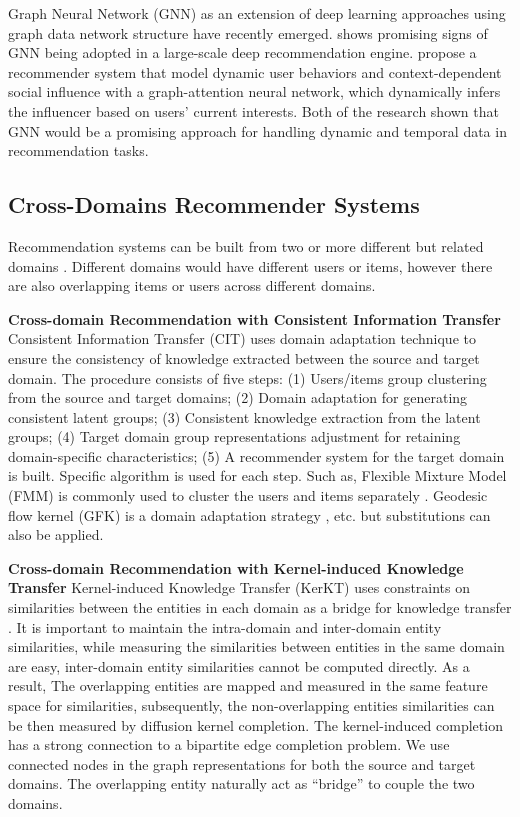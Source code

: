 Graph Neural Network (GNN) as an extension of deep learning approaches using graph data network structure have recently emerged. \citet{ying2018graph} shows promising signs of GNN being adopted in a large-scale deep recommendation engine. \citet{song2019session} propose a recommender system that model dynamic user behaviors and context-dependent social influence with a graph-attention neural network, which dynamically infers the influencer based on users’ current interests. Both of the research shown that GNN would be a promising approach for handling dynamic and temporal data in recommendation tasks.

\subsection{Cross-Domains Recommender Systems}
Recommendation systems can be built from two or more different but related domains \citep{fernandez2012cross}. Different domains would have different users or items, however there are also overlapping items or users across different domains. 

\bigskip
\textbf{Cross-domain Recommendation with Consistent Information Transfer}
Consistent Information Transfer (CIT) uses domain adaptation technique to ensure the consistency of knowledge extracted between the source and target domain. 
The procedure consists of five steps: (1) Users/items group clustering from the source and target domains; (2) Domain adaptation for generating consistent latent groups; (3) Consistent knowledge extraction from the latent groups; (4) Target domain group representations adjustment for retaining domain-specific characteristics; (5) A recommender system for the target domain is built. Specific algorithm is used for each step. Such as, Flexible Mixture Model (FMM) is commonly used to cluster the users and items separately \citep{si2003flexible}. Geodesic flow kernel (GFK) is a domain adaptation strategy \citep{gong2014learning}, etc. but substitutions can also be applied.

\bigskip
\textbf{Cross-domain Recommendation with Kernel-induced Knowledge Transfer}
Kernel-induced Knowledge Transfer (KerKT) uses constraints on similarities between the entities in each domain as a bridge for knowledge transfer \citep{zhang2018cross}. It is important to maintain the intra-domain and inter-domain entity similarities, while measuring the similarities between entities in the same domain are easy, inter-domain entity similarities cannot be computed directly.  
As a result, The overlapping entities are mapped and measured in the same feature space for similarities, subsequently, the non-overlapping entities similarities can be then measured by diffusion kernel completion.
The kernel-induced completion has a strong connection to a bipartite edge completion problem\citep{he2016birank}. We use connected nodes in the graph representations for both the source and target domains. The overlapping entity naturally act as “bridge” to couple the two domains.


